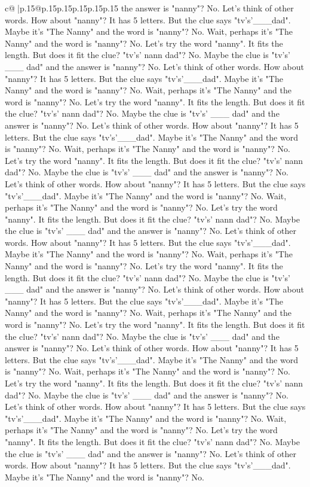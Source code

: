 \documentclass{article}
\begin{document}
{\begin{supertabular}{c@{$\;$}|p{.15\linewidth}@{}p{.15\linewidth}p{.15\linewidth}p{.15\linewidth}p{.15\linewidth}p{.15\linewidth}}
{{{the answer is "nanny"? No. Let's think of other words. How about "nanny"? It has 5 letters. But the clue says "tv's'\_\_\_dad". Maybe it's "The Nanny" and the word is "nanny"? No. Wait, perhaps it's "The Nanny" and the word is "nanny"? No. Let's try the word "nanny". It fits the length. But does it fit the clue? "tv's' nann dad"? No. Maybe the clue is "tv's' \_\_\_ dad" and the answer is "nanny"? No. Let's think of other words. How about "nanny"? It has 5 letters. But the clue says "tv's'\_\_\_dad". Maybe it's "The Nanny" and the word is "nanny"? No. Wait, perhaps it's "The Nanny" and the word is "nanny"? No. Let's try the word "nanny". It fits the length. But does it fit the clue? "tv's' nann dad"? No. Maybe the clue is "tv's' \_\_\_ dad" and the answer is "nanny"? No. Let's think of other words. How about "nanny"? It has 5 letters. But the clue says "tv's'\_\_\_dad". Maybe it's "The Nanny" and the word is "nanny"? No. Wait, perhaps it's "The Nanny" and the word is "nanny"? No. Let's try the word "nanny". It fits the length. But does it fit the clue? "tv's' nann dad"? No. Maybe the clue is "tv's' \_\_\_ dad" and the answer is "nanny"? No. Let's think of other words. How about "nanny"? It has 5 letters. But the clue says "tv's'\_\_\_dad". Maybe it's "The Nanny" and the word is "nanny"? No. Wait, perhaps it's "The Nanny" and the word is "nanny"? No. Let's try the word "nanny". It fits the length. But does it fit the clue? "tv's' nann dad"? No. Maybe the clue is "tv's' \_\_\_ dad" and the answer is "nanny"? No. Let's think of other words. How about "nanny"? It has 5 letters. But the clue says "tv's'\_\_\_dad". Maybe it's "The Nanny" and the word is "nanny"? No. Wait, perhaps it's "The Nanny" and the word is "nanny"? No. Let's try the word "nanny". It fits the length. But does it fit the clue? "tv's' nann dad"? No. Maybe the clue is "tv's' \_\_\_ dad" and the answer is "nanny"? No. Let's think of other words. How about "nanny"? It has 5 letters. But the clue says "tv's'\_\_\_dad". Maybe it's "The Nanny" and the word is "nanny"? No. Wait, perhaps it's "The Nanny" and the word is "nanny"? No. Let's try the word "nanny". It fits the length. But does it fit the clue? "tv's' nann dad"? No. Maybe the clue is "tv's' \_\_\_ dad" and the answer is "nanny"? No. Let's think of other words. How about "nanny"? It has 5 letters. But the clue says "tv's'\_\_\_dad". Maybe it's "The Nanny" and the word is "nanny"? No. Wait, perhaps it's "The Nanny" and the word is "nanny"? No. Let's try the word "nanny". It fits the length. But does it fit the clue? "tv's' nann dad"? No. Maybe the clue is "tv's' \_\_\_ dad" and the answer is "nanny"? No. Let's think of other words. How about "nanny"? It has 5 letters. But the clue says "tv's'\_\_\_dad". Maybe it's "The Nanny" and the word is "nanny"? No. Wait, perhaps it's "The Nanny" and the word is "nanny"? No. Let's try the word "nanny". It fits the length. But does it fit the clue? "tv's' nann dad"? No. Maybe the clue is "tv's' \_\_\_ dad" and the answer is "nanny"? No. Let's think of other words. How about "nanny"? It has 5 letters. But the clue says "tv's'\_\_\_dad". Maybe it's "The Nanny" and the word is "nanny"? No. }}}
\end{supertabular}}
\end{document}
